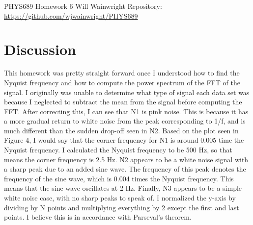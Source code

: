 \documentclass[twocolumn,11pt]{article}
\begin{document}
\pagestyle{plain}
\onecolumn
PHYS689 
\newline Homework 6
\newline Will Wainwright
\newline Repository: \href{https://github.com/wjwainwright/PHYS689}{https://github.com/wjwainwright/PHYS689}

\section*{Discussion}
This homework was pretty straight forward once I understood how to find the Nyquist frequency and how to compute the power spectrum of the FFT of the signal. I originally was unable to determine what type of signal each data set was because I neglected to subtract the mean from the signal before computing the FFT. After correcting this, I can see that N1 is pink noise. This is because it has a more gradual return to white noise from the peak corresponding to 1/f, and is much different than the sudden drop-off seen in N2. Based on the plot seen in Figure 4, I would say that the corner frequency for N1 is around 0.005 time the Nyquist frequency. I calculated the Nyquist frequency to be 500 Hz, so that means the corner frequency is 2.5 Hz. N2 appears to be a white noise signal with a sharp peak due to an added sine wave. The frequency of this peak denotes the frequency of the sine wave, which is 0.004 times the Nyquist frequency. This means that the sine wave oscillates at 2 Hz. Finally, N3 appears to be a simple white noise case, with no sharp peaks to speak of. I normalized the y-axis by dividing by N points and multiplying everything by 2 except the first and last points. I believe this is in accordance with Parseval's theorem.

\begin{figure}[!h]
	\centering
	\noindent
      \caption{}
\end{figure}
\end{document}
